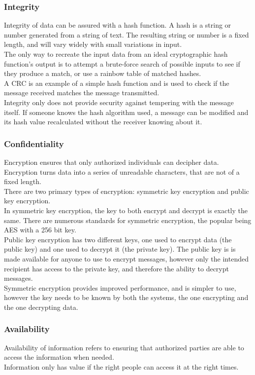 \subsubsection{Integrity}
Integrity of data can be assured with a hash function. A hash is a string or number generated from a string of text. The resulting string or number is a fixed length, and will vary widely with small variations in input.\\
The only way to recreate the input data from an ideal cryptographic hash function's output is to attempt a brute-force search of possible inputs to see if they produce a match, or use a rainbow table of matched hashes.\\
A CRC is an example of a simple hash function and is used to check if the message received matches the message transmitted.\\
Integrity only does not provide security against tempering with the message itself. If someone knows the hash algorithm used, a message can be modified and its hash value recalculated without the receiver knowing about it.
%
\subsubsection{Confidentiality}
Encryption ensures that only authorized individuals can decipher data. Encryption turns data into a series of unreadable characters, that are not of a fixed length.\\
There are two primary types of encryption: symmetric key encryption and public key encryption.\\
In symmetric key encryption, the key to both encrypt and decrypt is exactly the same. There are numerous standards for symmetric encryption, the popular being AES with a 256 bit key.\\
Public key encryption has two different keys, one used to encrypt data (the public key) and one used to decrypt it (the private key). The public key is is made available for anyone to use to encrypt messages, however only the intended recipient has access to the private key, and therefore the ability to decrypt messages.\\
Symmetric encryption provides improved performance, and is simpler to use, however the key needs to be known by both the systems, the one encrypting and the one decrypting data.\\
\subsubsection{Availability}
Availability of information refers to ensuring that authorized parties are able to access the information when needed.\\
Information only has value if the right people can access it at the right times. 
%

